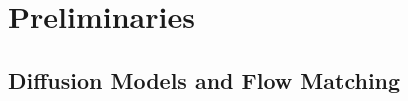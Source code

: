 





\section{Preliminaries}
\label{sec:method:prelim}

\subsection{Diffusion Models and Flow Matching}
\label{sec:method:prelim:basics}

